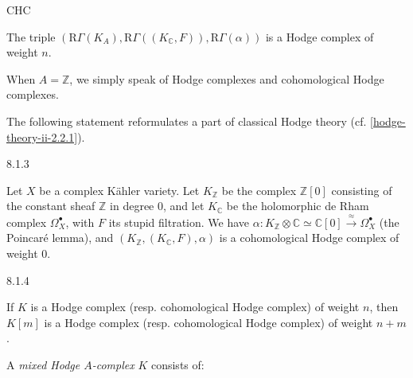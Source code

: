     \begin{axiom}{CHC}\label{hodge-theory-iii-8.1.2-chc}\skipsinglepar\par{}The triple \((\mathrm {R}\Gamma (K_A),\mathrm {R}\Gamma ((K_\mathbb {C},F)),\mathrm {R}\Gamma (\alpha ))\) is a Hodge complex of weight \(n\).\end{axiom}\par{}When \(A=\mathbb {Z}\), we simply speak of Hodge complexes and cohomological Hodge complexes.\par{}The following statement reformulates a part of classical Hodge theory (cf. \cref{hodge-theory-ii-2.2.1}).\begin{scholium}{8.1.3}\label{hodge-theory-iii-8.1.3}\skipsinglepar\par{}Let \(X\) be a complex Kähler variety.
    Let \(K_\mathbb {Z}\) be the complex \(\mathbb {Z}[0]\) consisting of the constant sheaf \(\mathbb {Z}\) in degree \(0\), and let \(K_\mathbb {C}\) be the holomorphic de Rham complex \(\Omega _X^\bullet \), with \(F\) its stupid filtration.
    We have \(\alpha \colon  K_\mathbb {Z}\otimes \mathbb {C}\simeq \mathbb {C}[0]\xrightarrow {\approx }\Omega _X^\bullet \) (the Poincaré lemma), and \((K_\mathbb {Z},(K_\mathbb {C},F),\alpha )\) is a cohomological Hodge complex of weight \(0\).\end{scholium}\begin{remark}{8.1.4}\label{hodge-theory-iii-8.1.4}\skipsinglepar\par{}If \(K\) is a Hodge complex (resp. cohomological Hodge complex) of weight \(n\), then \(K[m]\) is a Hodge complex (resp. cohomological Hodge complex) of weight \(n+m\).\end{remark}\label{hodge-theory-iii-8.1.5}\par{}A \emph{mixed Hodge \(A\)-complex} \(K\) consists of:

